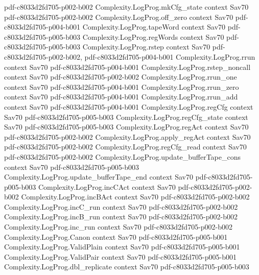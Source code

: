 \begin{theorem}
  {pdf-c8033d2fd705-p002-b002}
\proofstep
  {Complexity.LogProg.mkCfg_state}
  {context}
  {Sav70}
  {pdf-c8033d2fd705-p002-b002}
\proofstep
  {Complexity.LogProg.off_zero}
  {context}
  {Sav70}
  {pdf-c8033d2fd705-p004-b001}
\proofstep
  {Complexity.LogProg.tapeWord}
  {context}
  {Sav70}
  {pdf-c8033d2fd705-p005-b003}
\proofstep
  {Complexity.LogProg.regWords}
  {context}
  {Sav70}
  {pdf-c8033d2fd705-p005-b003}
\proofstep
  {Complexity.LogProg.rstep}
  {context}
  {Sav70}
  {pdf-c8033d2fd705-p002-b002,
    pdf-c8033d2fd705-p004-b001}
\proofstep
  {Complexity.LogProg.rrun}
  {context}
  {Sav70}
  {pdf-c8033d2fd705-p004-b001}
\proofstep
  {Complexity.LogProg.rstep_noncall}
  {context}
  {Sav70}
  {pdf-c8033d2fd705-p002-b002}
\proofstep
  {Complexity.LogProg.rrun_one}
  {context}
  {Sav70}
  {pdf-c8033d2fd705-p004-b001}
\proofstep
  {Complexity.LogProg.rrun_zero}
  {context}
  {Sav70}
  {pdf-c8033d2fd705-p004-b001}
\proofstep
  {Complexity.LogProg.rrun_add}
  {context}
  {Sav70}
  {pdf-c8033d2fd705-p004-b001}
\proofstep
  {Complexity.LogProg.regCfg}
  {context}
  {Sav70}
  {pdf-c8033d2fd705-p005-b003}
\proofstep
  {Complexity.LogProg.regCfg_state}
  {context}
  {Sav70}
  {pdf-c8033d2fd705-p005-b003}
\proofstep
  {Complexity.LogProg.regAct}
  {context}
  {Sav70}
  {pdf-c8033d2fd705-p002-b002}
\proofstep
  {Complexity.LogProg.apply_regAct}
  {context}
  {Sav70}
  {pdf-c8033d2fd705-p002-b002}
\proofstep
  {Complexity.LogProg.regCfg_read}
  {context}
  {Sav70}
  {pdf-c8033d2fd705-p002-b002}
\proofstep
  {Complexity.LogProg.update_bufferTape_cons}
  {context}
  {Sav70}
  {pdf-c8033d2fd705-p005-b003}
\proofstep
  {Complexity.LogProg.update_bufferTape_end}
  {context}
  {Sav70}
  {pdf-c8033d2fd705-p005-b003}
\proofstep
  {Complexity.LogProg.incCAct}
  {context}
  {Sav70}
  {pdf-c8033d2fd705-p002-b002}
\proofstep
  {Complexity.LogProg.incBAct}
  {context}
  {Sav70}
  {pdf-c8033d2fd705-p002-b002}
\proofstep
  {Complexity.LogProg.incC_run}
  {context}
  {Sav70}
  {pdf-c8033d2fd705-p002-b002}
\proofstep
  {Complexity.LogProg.incB_run}
  {context}
  {Sav70}
  {pdf-c8033d2fd705-p002-b002}
\proofstep
  {Complexity.LogProg.inc_run}
  {context}
  {Sav70}
  {pdf-c8033d2fd705-p002-b002}
\proofstep
  {Complexity.LogProg.Canon}
  {context}
  {Sav70}
  {pdf-c8033d2fd705-p005-b001}
\proofstep
  {Complexity.LogProg.ValidPlain}
  {context}
  {Sav70}
  {pdf-c8033d2fd705-p005-b001}
\proofstep
  {Complexity.LogProg.ValidPair}
  {context}
  {Sav70}
  {pdf-c8033d2fd705-p005-b001}
\proofstep
  {Complexity.LogProg.dbl_replicate}
  {context}
  {Sav70}
  {pdf-c8033d2fd705-p005-b003}
\proofstep

\end{theorem}
